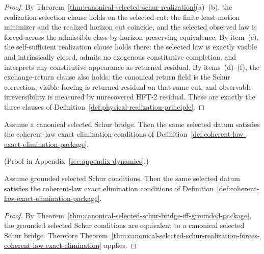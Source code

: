 \begin{proof}
By Theorem~\ref{thm:canonical-selected-schur-realization}(a)--(b), the
realization-selection clause holds on the selected cut: the finite least-motion
minimizer and the realized horizon cut coincide, and the selected observed law
is forced across the admissible class by horizon-preserving equivalence. By
item~(c), the self-sufficient realization clause holds there: the selected law
is exactly visible and intrinsically closed, admits no exogenous constitutive
completion, and interprets any constitutive appearance as returned residual.
By items~(d)--(f), the exchange-return clause also holds: the canonical return
field is the Schur correction, visible forcing is returned residual on that
same cut, and observable irreversibility is measured by unrecovered HFT-2
residual. These are exactly the three clauses of
Definition~\ref{def:physical-realization-principle}.
\end{proof}

\begin{theorem}
\label{thm:canonical-selected-schur-realization-forces-coherent-law-exact-elimination}
Assume a canonical selected Schur bridge. Then the same selected datum
satisfies the coherent-law exact elimination conditions of
Definition~\ref{def:coherent-law-exact-elimination-package}.
\end{theorem}

(Proof in Appendix~\ref{sec:appendix-dynamics}.)

\begin{corollary}
\label{cor:grounded-selected-schur-package-forces-coherent-law-exact-elimination}
Assume grounded selected Schur conditions. Then the same selected datum
satisfies the coherent-law exact elimination conditions of
Definition~\ref{def:coherent-law-exact-elimination-package}.
\end{corollary}

\begin{proof}
By
Theorem~\ref{thm:canonical-selected-schur-bridge-iff-grounded-package}, the
grounded selected Schur conditions are equivalent to a canonical selected Schur
bridge.
Therefore
Theorem~\ref{thm:canonical-selected-schur-realization-forces-coherent-law-exact-elimination}
applies.
\end{proof}

